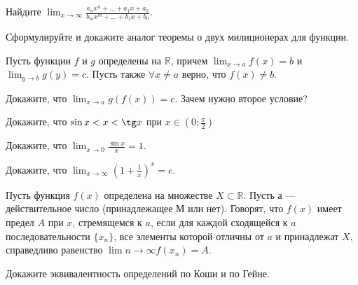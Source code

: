 \documentclass[a4paper, 12pt, num=32, date=]{listok}
\begin{document}
\begin{problem}
Найдите $\displaystyle \lim _{x \rightarrow \infty} \frac{a_{n} x^{n}+\ldots+a_{1} x+a_{0}}{b_{m} x^{m}+\ldots+b_{1} x+b_{0}}$.

\end{problem}

\begin{problem}
    Сформулируйте и докажите аналог теоремы о двух милиционерах для функции.
\end{problem}

\begin{problem}
\begin{probparts}
    \item Пусть функции $f$ и $g$ определены на $\mathbb{R}$, причем $\displaystyle \lim_{x \to a} f(x) = b$ и $\displaystyle \lim_{y \to b} g(y) = c$. Пусть также $\forall x \ne a$ верно, что $f(x) \ne b$.
    \item Докажите, что $\displaystyle \lim_{x \to a} g(f(x)) = c$. Зачем нужно второе условие?
\end{probparts}
\end{problem}


\begin{problem}
\begin{probparts}
    \item Докажите, что $\sin x < x < \tg x$  при $ x \in\left(0 ; \frac{\pi}{2}\right)$
    \item Докажите, что $\displaystyle \lim_{x \to 0} \frac{\sin x}{x} = 1$.
\end{probparts}
\end{problem}

\begin{problem}
    Докажите, что $\displaystyle \lim_{x \to \infty} \left(1 + \frac{1}{x} \right)^x = e$.
\end{problem}


\begin{definition}[(по Гейне)] Пусть функция $f(x)$ определена на множестве $X \subset \mathbb{R}$. Пусть $а$ --- действительное число (принадлежащее М или нет). Говорят, что $f(x)$ имеет предел $A$ при $x$, стремящемся к $a$, если для каждой сходящейся к $a$ последовательности $\{x_n\}$, все элементы которой отличны от $a$ и принадлежат $X$, справедливо равенство $\displaystyle \lim{n \to \infty} f(x_n) = A$.
\end{definition}


\begin{problem}
    Докажите эквивалентность определений по Коши и по Гейне.
\end{problem}
\end{document}
